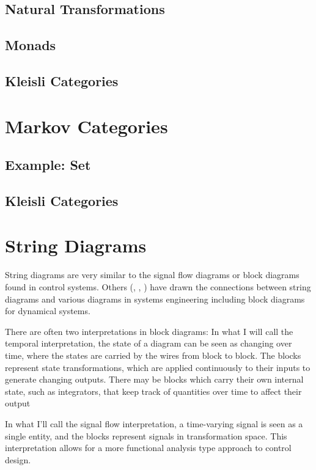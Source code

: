 \subsection{Natural Transformations}
\subsection{Monads}
\subsection{Kleisli Categories}

\section{Markov Categories}

\subsection{Example: Set}
\subsection{Kleisli Categories}

\section{String Diagrams}

String diagrams are very similar to the signal flow diagrams or block diagrams found in control systems.
Others (\cite{baez2015control}, \cite{fong2016thesis}, \cite{fong2016dynamicalsystems}) have drawn the connections between string diagrams and various diagrams in systems engineering including block diagrams for dynamical systems.

There are often two interpretations in block diagrams:
In what I will call the temporal interpretation, the state of a diagram can be seen as changing over time, where the states are carried by the wires from block to block. The blocks represent state transformations, which are applied continuously to their inputs to generate changing outputs.
There may be blocks which carry their own internal state, such as integrators, that keep track of quantities over time to affect their output

In what I'll call the signal flow interpretation, a time-varying signal is seen as a single entity, and the blocks represent signals in transformation space. This interpretation allows for a more functional analysis type approach to control design.

